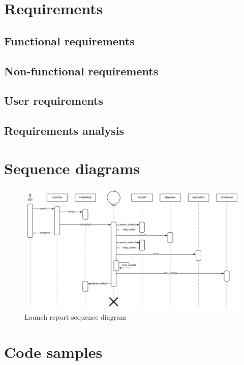 \section{Requirements}

\subsection{Functional requirements}

\subsection{Non-functional requirements}

\subsection{User requirements}

\subsection{Requirements analysis}

\section{Sequence diagrams}

\begin{figure}[h!]
\centering
\includegraphics[angle=90, scale=0.7]{imgs/SequenceDiagram.pdf}
\caption{Launch report sequence diagram}
\label{fig:sysarch}
\end{figure}

\section{Code samples}
